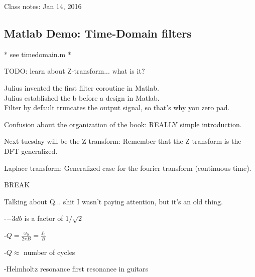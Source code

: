 Class notes: Jan 14, 2016

\subsection*{Matlab Demo: Time-Domain filters}
* see timedomain.m *


TODO: learn about Z-transform... what is it?

Julius invented the first filter coroutine in Matlab.
\\
Julius established the b before a design in Matlab.
\\
Filter by default truncates the output signal, so that's why you zero pad.

Confusion about the organization of the book: REALLY simple introduction.

Next tuesday will be the Z transform: Remember that the Z transform is the DFT generalized.

Laplace transform: Generalized case for the fourier transform (continuous time).

BREAK

Talking about Q... shit I wasn't paying attention, but it's an old thing.

-$-3db$ is a factor of $1/\sqrt{2}$

-$Q = \frac{\omega_0}{2 \pi B} = \frac{f_0}{B}$

-$Q \approx$ number of  cycles

-Helmholtz resonance first resonance in guitars %

